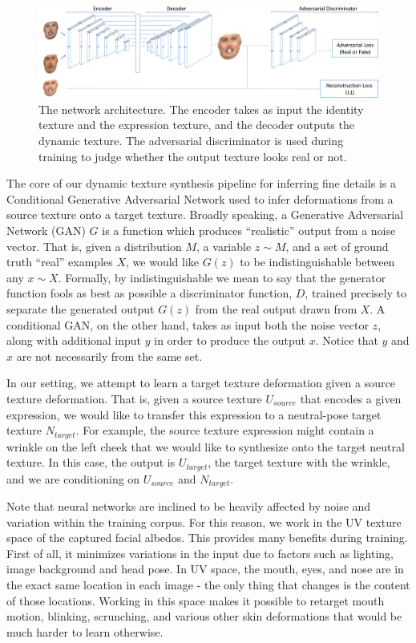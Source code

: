 \begin{figure}[th]
	\centering
	\includegraphics[width=1\linewidth]{figures/network/network.png}
	\caption{The network architecture. The encoder takes as input the identity texture and the expression texture, and the decoder outputs the dynamic texture. The adversarial discriminator is used during training to judge whether the output texture looks real or not.}\label{fig:network}
	\vspace{-0.15in}
\end{figure}

The core of our dynamic texture synthesis pipeline for inferring fine details is a Conditional Generative Adversarial Network used to infer deformations from a source texture onto a target texture.
Broadly speaking, a Generative Adversarial Network (GAN) $G$ is a function which produces ``realistic'' output from a noise vector.  
That is, given a distribution $M$, a variable $z \sim M$, and a set of ground truth ``real'' examples $X$,  we would like $G(z)$ to be indistinguishable between 
any $x \sim X$.  Formally, by indistinguishable we mean to say that the generator function fools as best as possible a discriminator function, $D$, 
trained precisely to separate the generated output $G(z)$ from the real output drawn from $X$. A conditional GAN, on the other hand, takes as input both the noise vector $z$, along with additional input $y$ in order to produce the output $x$.    
Notice that $y$ and $x$ are not necessarily from the same set.  

In our setting, we attempt to learn a target texture deformation given a source texture deformation.  
That is, given a source texture $U_{source}$ that encodes a given expression, we would like to transfer this expression to a neutral-pose target texture $N_{target}$.  
For example, the source texture expression might contain a wrinkle on the left cheek that we would like to synthesize onto the target neutral texture. 
In this case, the output is $U_{target}$, the target texture with the wrinkle, and we are conditioning on $U_{source}$ and $N_{target}$.  


Note that neural networks are inclined to be heavily affected by noise and variation within the training corpus.  For this reason, we work in the UV texture space of the captured facial albedos.  This provides many benefits during training.  First of all, it minimizes variations in the input due to factors such as lighting, image background and head pose. In UV space, the mouth, eyes, and nose are in the exact same location in each image - the only thing that changes is the content of those locations. Working in this space makes it possible to retarget mouth motion, blinking, scrunching, and various other skin deformations that would be much harder to learn otherwise.  



